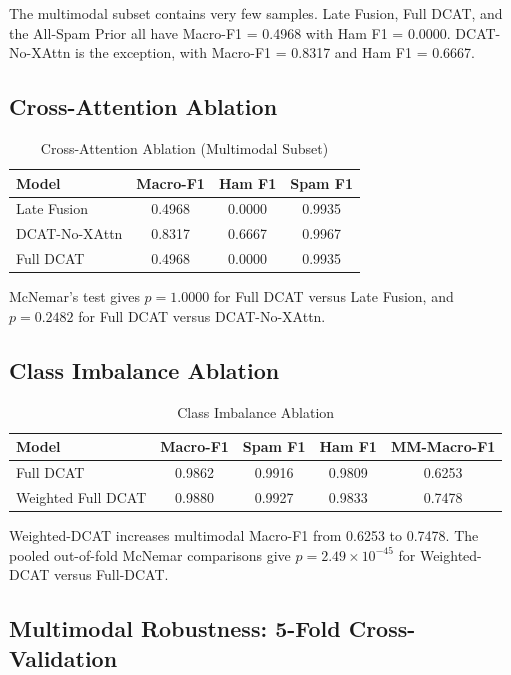 \documentclass[conference]{IEEEtran}
\begin{document}
The multimodal subset contains very few samples. Late Fusion, Full DCAT, and the All-Spam Prior all have Macro-F1 = 0.4968 with Ham F1 = 0.0000. DCAT-No-XAttn is the exception, with Macro-F1 = 0.8317 and Ham F1 = 0.6667.

\subsection{Cross-Attention Ablation}

\begin{table}[htbp]
\centering
\renewcommand{\arraystretch}{1.2}
\caption{Cross-Attention Ablation (Multimodal Subset)}
\label{tab:4}
\begin{tabular}{lccc}
\toprule
Model & Macro-F1 & Ham F1 & Spam F1 \\
\midrule
Late Fusion & 0.4968 & 0.0000 & 0.9935 \\
DCAT-No-XAttn & 0.8317 & 0.6667 & 0.9967 \\
Full DCAT & 0.4968 & 0.0000 & 0.9935 \\
\bottomrule
\end{tabular}
\end{table}

McNemar's test gives $p=1.0000$ for Full DCAT versus Late Fusion, and $p=0.2482$ for Full DCAT versus DCAT-No-XAttn.

\subsection{Class Imbalance Ablation}

\begin{table}[htbp]
\centering
\renewcommand{\arraystretch}{1.2}
\caption{Class Imbalance Ablation}
\label{tab:5}
\begin{tabular}{lcccc}
\toprule
Model & Macro-F1 & Spam F1 & Ham F1 & MM-Macro-F1 \\
\midrule
Full DCAT & 0.9862 & 0.9916 & 0.9809 & 0.6253 \\
Weighted Full DCAT & 0.9880 & 0.9927 & 0.9833 & 0.7478 \\
\bottomrule
\end{tabular}
\end{table}

Weighted-DCAT increases multimodal Macro-F1 from 0.6253 to 0.7478. The pooled out-of-fold McNemar comparisons give $p = 2.49 \times 10^{-45}$ for Weighted-DCAT versus Full-DCAT.

\subsection{Multimodal Robustness: 5-Fold Cross-Validation}
\end{document}
